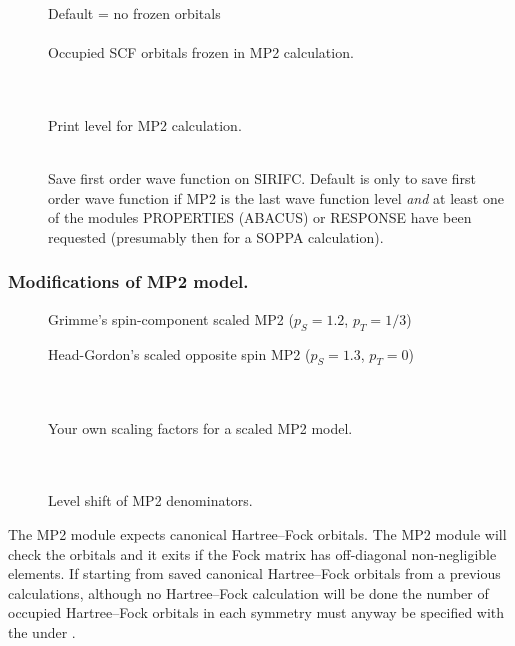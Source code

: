 \begin{description}

\item[]
  Default = no frozen orbitals\\
   \\
  Occupied SCF orbitals frozen in MP2 calculation.

\item[] \ \\
   \\
  Print level for MP2 calculation.

\item[] \ \\
  Save first order wave function on SIRIFC.
  Default is only to save first order wave function if MP2 is the last wave function level
  \emph{and} at least one of the modules PROPERTIES (ABACUS) or RESPONSE have been
  requested (presumably then for a SOPPA calculation).

\end{description}

\subsubsection*{Modifications of MP2 model.}

\begin{description}

\item[]
  Grimme's spin-component scaled MP2 ($p_S = 1.2$, $p_T = 1/3$)

\item[]
  Head-Gordon's scaled opposite spin MP2 ($p_S = 1.3$, $p_T = 0$)

\item[] \ \\
   \\
  Your own scaling factors for a scaled MP2 model.

\item[] \ \\
   \\
  Level shift of MP2 denominators.
\end{description}


The MP2 module expects canonical Hartree--Fock orbitals. The MP2 module will
check the orbitals and it exits if the Fock matrix has off-diagonal non-negligible
elements.
If starting from saved canonical Hartree--Fock orbitals from a previous calculations,
although no Hartree--Fock calculation will be done
the number of occupied Hartree--Fock orbitals in each symmetry must anyway be
specified with the  under .

